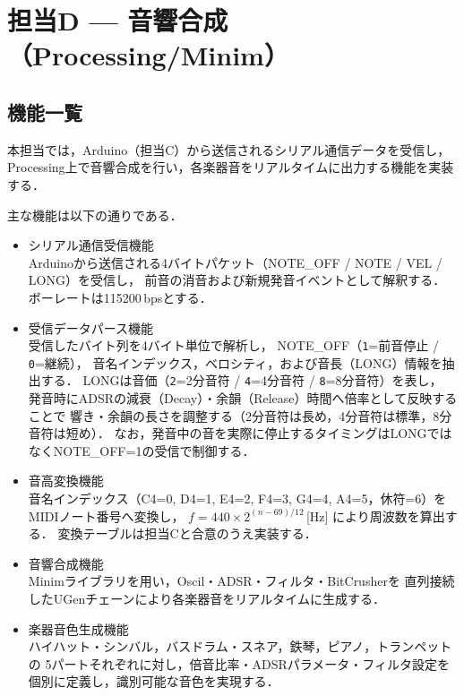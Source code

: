 \section{担当D — 音響合成（Processing/Minim）}

\subsection{機能一覧}
本担当では，Arduino（担当C）から送信されるシリアル通信データを受信し，
Processing上で音響合成を行い，各楽器音をリアルタイムに出力する機能を実装する．

主な機能は以下の通りである．

\begin{itemize}

  \item シリアル通信受信機能 \\
  Arduinoから送信される4バイトパケット（NOTE\_OFF / NOTE / VEL / LONG）を受信し，
  前音の消音および新規発音イベントとして解釈する．
  ボーレートは115200\,bpsとする．

  \item 受信データパース機能 \\
  受信したバイト列を4バイト単位で解析し，
  NOTE\_OFF（\texttt{1}=前音停止 / \texttt{0}=継続），
  音名インデックス，ベロシティ，および音長（LONG）情報を抽出する．
  LONGは音価（\texttt{2}=2分音符 / \texttt{4}=4分音符 / \texttt{8}=8分音符）を表し，
  発音時にADSRの減衰（Decay）・余韻（Release）時間へ倍率として反映することで
  響き・余韻の長さを調整する（2分音符は長め，4分音符は標準，8分音符は短め）．
  なお，発音中の音を実際に停止するタイミングはLONGではなくNOTE\_OFF=1の受信で制御する．

  \item 音高変換機能 \\
  音名インデックス（C4=0, D4=1, E4=2, F4=3, G4=4, A4=5，休符=6）を
  MIDIノート番号へ変換し，
  $f = 440 \times 2^{(n-69)/12}$\,[Hz] により周波数を算出する．
  変換テーブルは担当Cと合意のうえ実装する．

  \item 音響合成機能 \\
  Minimライブラリを用い，Oscil・ADSR・フィルタ・BitCrusherを
  直列接続したUGenチェーンにより各楽器音をリアルタイムに生成する．

  \item 楽器音色生成機能 \\
  ハイハット・シンバル，バスドラム・スネア，鉄琴，ピアノ，トランペットの
  5パートそれぞれに対し，倍音比率・ADSRパラメータ・フィルタ設定を
  個別に定義し，識別可能な音色を実現する．


\end{itemize}
